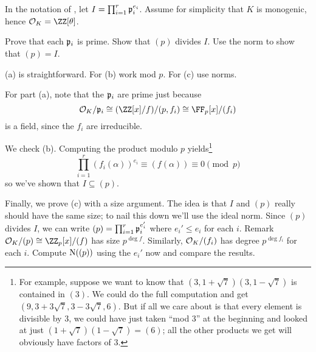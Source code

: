 \begin{problem}
	\label{prob:prove_factoring_algorithm}
	In the notation of , let $I = \prod_{i=1}^r \mathfrak p_i^{e_i}$.
	Assume for simplicity that $K$ is monogenic, hence $\OO_K = \ZZ[\theta]$.
	\begin{enumerate}[(a)]
		\ii Prove that each $\mathfrak p_i$ is prime.
		\ii Show that $(p)$ divides $I$.
		\ii Use the norm to show that $(p) = I$.
	\end{enumerate}
	\begin{hint}
		(a) is straightforward.
		For (b) work mod $p$.
		For (c) use norms.
	\end{hint}
	\begin{sol}
	For part (a), note that the $\mathfrak p_i$ are prime
	just because 
	\[ \OO_K / \pp_i
		\cong (\ZZ[x] / f) / (p, f_i)
		\cong \FF_p[x] / (f_i) \]
	is a field, since the $f_i$ are irreducible.

	We check (b).
		Computing the product modulo $p$ yields\footnote{%
			For example, suppose we want to know that $(3, 1+\sqrt{7})(3, 1-\sqrt{7})$ is contained in $(3)$.
			We could do the full computation and get $(9, 3+3\sqrt{7}, 3-3\sqrt{7}, 6)$.
			But if all we care about is that every element is divisible by $3$, we could have just taken ``mod $3$''
			at the beginning and looked at just $(1+\sqrt{7})(1-\sqrt{7}) = (6)$;
			all the other products we get will obviously have factors of $3$.
		}
		\[ \prod_{i=1}^{r} (f_i(\alpha))^{e_i}
			\equiv (f(\alpha)) \equiv 0 \pmod p \]
		so we've shown that $I \subseteq (p)$.

	Finally, we prove (c) with a size argument.
		The idea is that $I$ and $(p)$ really should have the same size;
		to nail this down we'll use the ideal norm.
		Since $(p)$ divides $I$, we can write
		$ (p) = \prod_{i=1}^r \mathfrak p_i^{e_i'} $
		where $e_i' \le e_i$ for each $i$.
		Remark $\OO_K / (p) \cong \Zc p[x] / (f)$ has size $p^{\deg f}$.
		Similarly, $\mathcal O_K / (f_i)$ has degree $p^{\deg f_i}$ for each $i$.
		Compute $\operatorname{N}( (p) )$ using the $e_i'$ now and compare the results.
	\end{sol}
\end{problem}
